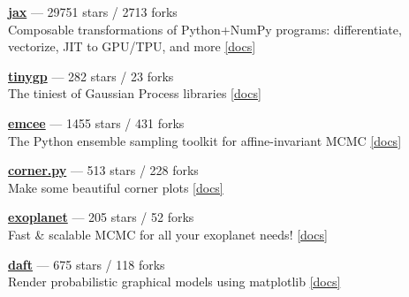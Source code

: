 \item \href{https://github.com/google/jax}{{\bf jax}} --- 29751 stars / 2713 forks \\
Composable transformations of Python+NumPy programs: differentiate, vectorize, JIT to GPU/TPU, and more \href{http://jax.readthedocs.io/}{[docs]}

\item \href{https://github.com/dfm/tinygp}{{\bf tinygp}} --- 282 stars / 23 forks \\
The tiniest of Gaussian Process libraries \href{https://tinygp.readthedocs.io}{[docs]}

\item \href{https://github.com/dfm/emcee}{{\bf emcee}} --- 1455 stars / 431 forks \\
The Python ensemble sampling toolkit for affine-invariant MCMC \href{https://emcee.readthedocs.io}{[docs]}

\item \href{https://github.com/dfm/corner.py}{{\bf corner.py}} --- 513 stars / 228 forks \\
Make some beautiful corner plots \href{http://corner.readthedocs.io}{[docs]}

\item \href{https://github.com/exoplanet-dev/exoplanet}{{\bf exoplanet}} --- 205 stars / 52 forks \\
Fast {\&} scalable MCMC for all your exoplanet needs!  \href{https://docs.exoplanet.codes}{[docs]}

\item \href{https://github.com/daft-dev/daft}{{\bf daft}} --- 675 stars / 118 forks \\
Render probabilistic graphical models using matplotlib \href{https://docs.daft-pgm.org}{[docs]}